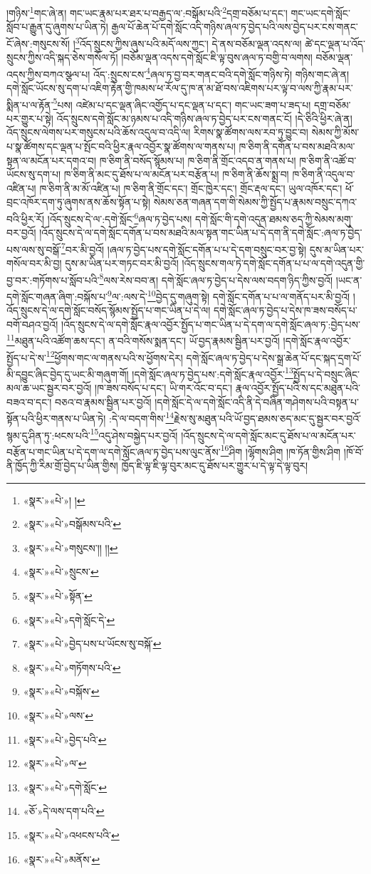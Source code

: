 །གཉིས་\footnote{«སྣར་»«པེ་»། །}གང་ཞེ་ན། གང་ཡང་རྣམ་པར་ཐར་པ་བརྒྱད་ལ་:བསྒོམ་པའི་\footnote{«སྣར་»«པེ་»བསྒོམས་པའི་}དགྲ་བཅོམ་པ་དང་། གང་ཡང་དགེ་སློང་སློབ་པ་རྒྱུན་དུ་ཞུགས་པ་ཡིན་ཏེ། རྒྱལ་པོ་ཆེན་པོ་དགེ་སློང་འདི་གཉིས་ཞལ་ཏ་བྱེད་པའི་ལས་བྱེད་པར་ངས་གནང་ངོ་ཞེས་:གསུངས་སོ། །\footnote{«སྣར་»«པེ་»གསུངས་།། །།}འོད་སྲུངས་ཀྱིས་ཞུས་པའི་མདོ་ལས་ཀྱང་། དེ་ནས་བཅོམ་ལྡན་འདས་ལ། ཚེ་དང་ལྡན་པ་འོད་སྲུངས་ཀྱིས་འདི་སྐད་ཅེས་གསོལ་ཏོ། །བཅོམ་ལྡན་འདས་དགེ་སློང་ཇི་ལྟ་བུས་ཞལ་ཏ་བགྱི་བ་ལགས། བཅོམ་ལྡན་འདས་ཀྱིས་བཀའ་སྩལ་པ། འོད་:སྲུངས་ངས་\footnote{«སྣར་»«པེ་»སྲུངས་}ཞལ་ཏ་བྱ་བར་གནང་བའི་དགེ་སློང་གཉིས་ཏེ། གཉིས་གང་ཞེ་ན། དགེ་སློང་ཡོངས་སུ་དག་པ་འཇིག་རྟེན་གྱི་ཁམས་ཕ་རོལ་དུ་ཁ་ན་མ་ཐོ་བས་འཇིགས་པར་ལྟ་བ་ལས་ཀྱི་རྣམ་པར་སྨིན་པ་ལ་རྟོན་\footnote{«སྣར་»«པེ་»སྟོན་}པས། འཛེམ་པ་དང་ལྡན་ཞིང་འགྱོད་པ་དང་ལྡན་པ་དང་། གང་ཡང་ཟག་པ་ཟད་པ། དགྲ་བཅོམ་པར་གྱུར་པ་སྟེ། འོད་སྲུངས་དགེ་སློང་མ་ཉམས་པ་འདི་གཉིས་ཞལ་ཏ་བྱེད་པར་ངས་གནང་ངོ། །དེ་ཅིའི་ཕྱིར་ཞེ་ན། འོད་སྲུངས་ལེགས་པར་གསུངས་པའི་ཆོས་འདུལ་བ་འདི་ལ། རིགས་སྣ་ཚོགས་ལས་རབ་ཏུ་བྱུང་བ། སེམས་ཀྱི་མོས་པ་སྣ་ཚོགས་དང་ལྡན་པ་སྤོང་བའི་ཕྱིར་རྣལ་འབྱོར་སྣ་ཚོགས་ལ་གནས་པ། ཁ་ཅིག་ནི་དགོན་པ་བས་མཐའི་མལ་སྟན་ལ་མངོན་པར་དགའ་བ། ཁ་ཅིག་ནི་བསོད་སྙོམས་པ། ཁ་ཅིག་ནི་གྲོང་འདབ་ན་གནས་པ། ཁ་ཅིག་ནི་འཚོ་བ་ཡོངས་སུ་དག་པ། ཁ་ཅིག་ནི་མང་དུ་ཐོས་པ་ལ་མངོན་པར་བརྩོན་པ། ཁ་ཅིག་ནི་ཆོས་སྨྲ་བ། ཁ་ཅིག་ནི་འདུལ་བ་འཛིན་པ། ཁ་ཅིག་ནི་མ་མོ་འཛིན་པ། ཁ་ཅིག་ནི་གྲོང་དང་། གྲོང་ཁྱེར་དང་། གྲོང་རྡལ་དང་། ཡུལ་འཁོར་དང་། ཕོ་བྲང་འཁོར་དག་ཏུ་ཞུགས་ནས་ཆོས་སྟོན་པ་སྟེ། སེམས་ཅན་གཞན་དག་གི་སེམས་ཀྱི་སྤྱོད་པ་རྣམས་བསྲུང་དཀའ་བའི་ཕྱིར་རོ། །འོད་སྲུངས་དེ་ལ་:དགེ་སློང་\footnote{«སྣར་»«པེ་»དགེ་སློང་དེ་}ཞལ་ཏ་བྱེད་པས། དགེ་སློང་གི་དགེ་འདུན་ཐམས་ཅད་ཀྱི་སེམས་མགུ་བར་བྱའོ། །འོད་སྲུངས་དེ་ལ་དགེ་སློང་དགོན་པ་བས་མཐའི་མལ་སྟན་གང་ཡིན་པ་དེ་དག་ནི་དགེ་སློང་:ཞལ་ཏ་བྱེད་པས་ལས་སུ་བསྒོ་\footnote{«སྣར་»«པེ་»བྱེད་པས་པ་ཡོངས་སུ་བསྐོ་}བར་མི་བྱའོ། །ཞལ་ཏ་བྱེད་པས་དགེ་སློང་དགོན་པ་པ་དེ་དག་བསྲུང་བར་བྱ་སྟེ། དུས་མ་ཡིན་པར་གསོལ་བར་མི་བྱ། དུས་མ་ཡིན་པར་གཏང་བར་མི་བྱའོ། །འོད་སྲུངས་གལ་ཏེ་དགེ་སློང་དགོན་པ་པ་ལ་དགེ་འདུན་གྱི་བྱ་བར་:གཏོགས་པ་སློབ་པའི་\footnote{«སྣར་»«པེ་»གཏོགས་པའི་}ལས་རེས་བབ་ན། དགེ་སློང་ཞལ་ཏ་བྱེད་པ་དེས་ལས་བདག་ཉིད་ཀྱིས་བྱའོ། །ཡང་ན་དགེ་སློང་གཞན་ཞིག་:བསྐོས་པ་\footnote{«སྣར་»«པེ་»བསྐོས་}ལ་:ལས་དེ་\footnote{«སྣར་»«པེ་»ལས་}བྱེད་དུ་གཞུག་སྟེ། དགེ་སློང་དགོན་པ་པ་ལ་གནོད་པར་མི་བྱའོ། །འོད་སྲུངས་དེ་ལ་དགེ་སློང་བསོད་སྙོམས་སྤྱོད་པ་གང་ཡིན་པ་དེ་ལ། དགེ་སློང་ཞལ་ཏ་བྱེད་པ་དེས་ཁ་ཟས་བསོད་པ་བགོ་བཤའ་བྱའོ། །འོད་སྲུངས་དེ་ལ་དགེ་སློང་རྣལ་འབྱོར་སྤྱོད་པ་གང་ཡིན་པ་དེ་དག་ལ་དགེ་སློང་ཞལ་ཏ་:བྱེད་པས་\footnote{«སྣར་»«པེ་»བྱེད་པའི་}མཐུན་པའི་འཚོག་ཆས་དང་། ན་བའི་གསོས་སྨན་དང་། ཡོ་བྱད་རྣམས་སྦྱིན་པར་བྱའོ། །དགེ་སློང་རྣལ་འབྱོར་སྤྱོད་པ་དེ་ས་\footnote{«སྣར་»«པེ་»ལ་}ཕྱོགས་གང་ལ་གནས་པའི་ས་ཕྱོགས་དེར། དགེ་སློང་ཞལ་ཏ་བྱེད་པ་དེས་སྒྲ་ཆེན་པོ་དང་སྐད་དྲག་པོ་མི་དབྱུང་ཞིང་བྱེད་དུ་ཡང་མི་གཞུག་གོ། །དགེ་སློང་ཞལ་ཏ་བྱེད་པས་:དགེ་སློང་རྣལ་འབྱོར་\footnote{«སྣར་»«པེ་»དགེ་སློང་}སྤྱོད་པ་དེ་བསྲུང་ཞིང་མལ་ཆ་ཡང་སྦྱར་བར་བྱའོ། །ཁ་ཟས་བསོད་པ་དང་། ཡི་གར་འོང་བ་དང་། རྣལ་འབྱོར་སྤྱོད་པའི་ས་དང་མཐུན་པའི་བཟའ་བ་དང་། བཅའ་བ་རྣམས་སྦྱིན་པར་བྱའོ། །དགེ་སློང་དེ་ལ་དགེ་སློང་འདི་ནི་དེ་བཞིན་གཤེགས་པའི་བསྟན་པ་སྟོན་པའི་ཕྱིར་གནས་པ་ཡིན་ཏེ། :དེ་ལ་བདག་གིས་\footnote{«ཅོ་»དེ་ལས་དག་པའི་}རྗེས་སུ་མཐུན་པའི་ཡོ་བྱད་ཐམས་ཅད་མང་དུ་སྦྱར་བར་བྱའོ་སྙམ་དུ་ཤིན་ཏུ་:ཕངས་པའི་\footnote{«སྣར་»«པེ་»འཕངས་པའི་}འདུ་ཤེས་བསྐྱེད་པར་བྱའོ། །འོད་སྲུངས་དེ་ལ་དགེ་སློང་མང་དུ་ཐོས་པ་ལ་མངོན་པར་བརྩོན་པ་གང་ཡིན་པ་དེ་དག་ལ་དགེ་སློང་ཞལ་ཏ་བྱེད་པས་ལུང་ནོས་\footnote{«སྣར་»«པེ་»མནོས་}ཤིག །ལྷོགས་ཤིག །ཁ་ཏོན་གྱིས་ཤིག །ཁོ་བོ་ནི་ཁྱོད་ཀྱི་རིམ་གྲོ་བྱེད་པ་ཡིན་གྱིས། ཁྱོད་ཇི་ལྟ་ཇི་ལྟ་བུར་མང་དུ་ཐོས་པར་གྱུར་པ་དེ་ལྟ་དེ་ལྟ་བུར། 